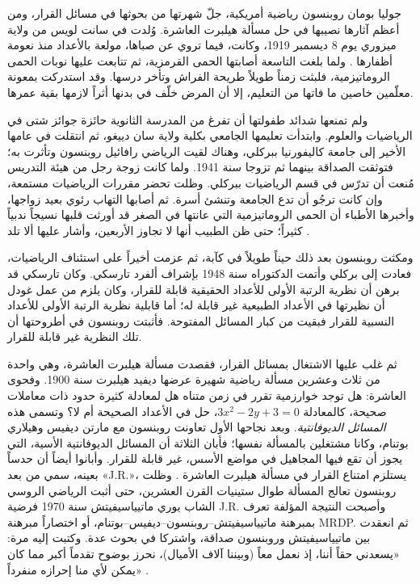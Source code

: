 \documentclass[../../../include/open-logic-section]{subfiles}
\begin{document}



جوليا بومان روبنسون رياضية أمريكية، جلّ شهرتها من بحوثها في مسائل القرار،
ومن أعظم آثارها نصيبها في حل مسألة هيلبرت العاشرة. وُلدت في سانت لويس من
ولاية ميزوري يوم 8 ديسمبر 1919، وكانت، فيما تروي عن صباها، مولعة بالأعداد
منذ نعومة أظفارها \citep[4]{Reid1986}. ولما بلغت التاسعة أصابتها الحمى
القرمزية، ثم تتابعت عليها نوبات الحمى الروماتيزمية، فلبثت زمناً طويلاً
طريحة الفراش وتأخر درسها. وقد استدركت بمعونة معلّمين خاصين ما فاتها من
التعليم، إلا أن المرض خلّف في بدنها أثراً لازمها بقية عمرها.

ولم تمنعها شدائد طفولتها أن تفرغ من المدرسة الثانوية حائزة جوائز شتى في
الرياضيات والعلوم. وابتدأت تعليمها الجامعي بكلية ولاية سان دييغو، ثم
انتقلت في عامها الأخير إلى جامعة كاليفورنيا ببركلي، وهناك لقيت الرياضي
رافائيل روبنسون وتأثرت به؛ فتوثقت الصداقة بينهما ثم تزوجا سنة 1941. ولما
كانت زوجة رجل من هيئة التدريس مُنعت أن تدرّس في قسم الرياضيات ببركلي.
وظلت تحضر مقررات الرياضيات مستمعة، وإن كانت ترجُو أن تدع الجامعة وتنشئ
أسرة. ثم أصابها التهاب رئوي بعيد زواجها، وأخبرها الأطباء أن الحمى
الروماتيزمية التي عانتها في الصغر قد أورثت قلبها نسيجاً ندبياً كثيراً؛
حتى ظن الطبيب أنها لا تجاوز الأربعين، وأشار عليها ألا تلد
\citep[13]{Reid1986}.

ومكثت روبنسون بعد ذلك حيناً طويلاً في كآبة، ثم عزمت أخيراً على استئناف
الرياضيات، فعادت إلى بركلي وأتمت الدكتوراه سنة 1948 بإشراف ألفرد تارسكي.
وكان تارسكي قد برهن أن نظرية الرتبة الأولى للأعداد الحقيقية قابلة للقرار،
وكان يلزم من عمل غودل أن نظيرتها في الأعداد الطبيعية غير قابلة له؛ أما
قابلية نظرية الرتبة الأولى للأعداد النسبية للقرار فبقيت من كبار المسائل
المفتوحة. فأثبتت روبنسون في أطروحتها \citeyearpar{Robinson1949} أن تلك
النظرية غير قابلة للقرار.

ثم غلب عليها الاشتغال بمسائل القرار، فقصدت مسألة هيلبرت العاشرة، وهي واحدة
من ثلاث وعشرين مسألة رياضية شهيرة عرضها ديفيد هيلبرت سنة 1900. وفحوى
العاشرة: هل توجد خوارزمية تقرر في زمن متناه هل لمعادلة كثيرة حدود ذات معاملات
صحيحة، كالمعادلة $3x^2 - 2y +3 = 0$، حل في الأعداد الصحيحة أم لا؟ وتسمى
هذه \emph{المسائل الديوفانتية}. وبعد نجاحها الأول تعاونت روبنسون مع مارتن
ديفيس وهيلاري بوتنام، وكانا مشتغلين بالمسألة نفسها؛ فأبان الثلاثة أن
المسائل الديوفانتية الأسية، التي يجوز أن تقع فيها المجاهيل في مواضع
الأسس، غير قابلة للقرار. وأبانوا أيضاً أن حدساً بعينه، سمي من بعد «J.R.»،
يستلزم امتناع القرار في مسألة هيلبرت العاشرة
\citep{DavisPutnamRobinson1961}. وظلت روبنسون تعالج المسألة طوال ستينيات
القرن العشرين، حتى أثبت الرياضي الروسي الشاب يوري ماتيياسيفيتش سنة 1970
فرضية J.R. وأصبحت النتيجة المؤلفة تعرف بمبرهنة
ماتيياسيفيتش--روبنسون--ديفيس--بوتنام، أو اختصاراً مبرهنة MRDP. ثم انعقدت
بين ماتيياسيفيتش وروبنسون صداقة، واشتركا في بحوث عدة. وكتبت إليه مرة:
«يسعدني حقاً أننا، إذ نعمل معاً (وبيننا آلاف الأميال)، نحرز بوضوح تقدماً
أكبر مما كان يمكن لأي منا إحرازه منفرداً» \citep[45]{Matijasevich1992}.
\end{document}
